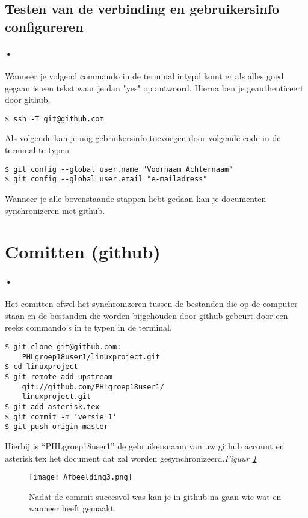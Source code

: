 \documentclass[12pt,a4paper]{report}
\begin{document}
\subsection{Testen van de verbinding en gebruikersinfo configureren}
\paragraph{•}
Wanneer je volgend commando in de terminal intypd komt er als alles goed gegaan is een tekst waar je dan "yes" op antwoord. Hierna ben je geauthenticeert door github.
\begin{lstlisting}[frame=BTrl]
$ ssh -T git@github.com
\end{lstlisting}
Als volgende kan je nog gebruikersinfo toevoegen door volgende code in de terminal te typen
\begin{lstlisting}[frame=BTrl]
$ git config --global user.name "Voornaam Achternaam"
$ git config --global user.email "e-mailadress"
\end{lstlisting}
Wanneer je alle bovenstaande stappen hebt gedaan kan je documenten synchronizeren met github.

\section{Comitten (github)}
\paragraph{•}
Het comitten ofwel het synchronizeren tussen de bestanden die op de computer staan en de bestanden die worden bijgehouden door github gebeurt door een reeks commando's in te typen in de terminal.
\begin{lstlisting}[frame=BTrl]
$ git clone git@github.com:
	PHLgroep18user1/linuxproject.git
$ cd linuxproject
$ git remote add upstream 
	git://github.com/PHLgroep18user1/
	linuxproject.git
$ git add asterisk.tex
$ git commit -m 'versie 1'
$ git push origin master
\end{lstlisting}
Hierbij is ``PHLgroep18user1'' de gebruikersnaam van uw github account en asterisk.tex het document dat zal worden gesynchronizeerd.\emph{Figuur \ref{afbeelding3}}
\begin{figure} [h]
\texttt{[image: Afbeelding3.png]}
\caption[Historie github]{Nadat de commit succesvol was kan je in github na gaan wie wat en wanneer heeft gemaakt.}
\label{afbeelding3}
\end{figure}
\end{document}
